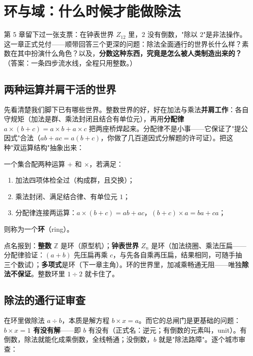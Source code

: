 \chapter{环与域：什么时候才能做除法}

第 5 章留下过一张支票：在钟表世界 $Z_{12}$ 里，$2$ 没有倒数，"除以 $2$"是非法操作。这一章正式兑付——顺带回答三个更深的问题：除法全面通行的世界长什么样？素数在其中扮演什么角色？以及，\textbf{分数这种东西，究竟是怎么被人类制造出来的？}（答案：一条四步流水线，全程只用整数。）

\section{两种运算并肩干活的世界}

先看清楚我们脚下已有哪些世界。整数世界的好，好在加法与乘法\textbf{并肩工作}：各自守规矩（加法是群、乘法封闭且结合有单位元），再用\textbf{分配律} $a\times(b+c) = a\times b + a\times c$ 把两座桥焊起来。分配律不是小事——它保证了"提公因式"合法（$ab + ac = a(b+c)$，你做了几百道因式分解题的许可证）。把这种"双运算结构"抽象出来：

\begin{dingyi}[环]
一个集合配两种运算 $+$ 和 $\times$，若满足：
\begin{enumerate}
  \item 加法四项体检全过（构成群，且交换）；
  \item 乘法封闭、满足结合律、有单位元 $1$；
  \item 分配律连接两运算：$a\times(b+c) = ab + ac$，$(b+c)\times a = ba + ca$；
\end{enumerate}
则称为一个\textbf{环}（ring）。
\end{dingyi}

点名报到：\textbf{整数} $\mathbb{Z}$ 是环（原型机）；\textbf{钟表世界} $Z_n$ 是环（加法绕圈、乘法压扁——分配律验证：$(a+b)$ 先压扁再乘 $c$，与先各自乘再压扁，结果相同，可随手抽三个数试）；\textbf{多项式}是环（下一章主角）。环的世界里，加减乘畅通无阻——唯独\textbf{除法不保证}。整数环里 $1\div 2$ 就卡住了。

\section{除法的通行证审查}

在环里做除法 $a \div b$，本质是解方程 $b\times x = a$。而它的总闸门是更基础的问题：\textbf{$b\times x = 1$ 有没有解}——即 $b$ 有没有（正式名：逆元；有倒数的元素叫，unit）。有倒数，除法就能化成乘倒数，全线畅通；没倒数，$b$ 就是"除法路障"。逐个城市审查：

